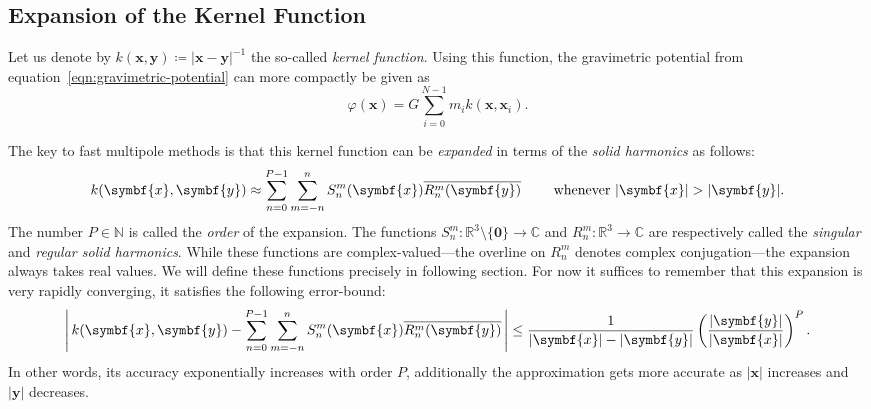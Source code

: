 \documentclass{scrbook}
\newcommand{\naturals}{\ensuremath{\mathbb{N}}}
\newcommand{\reals}{\ensuremath{\mathbb{R}}}
\newcommand{\complex}{\mathbb{C}}
\newcommand{\wholespace}{\ensuremath{\reals^3}}
\newcommand{\vv}[1]{\ensuremath{\symbf{#1}}} %
\begin{document}
\subsection{Expansion of the Kernel Function}
Let us denote by $k(\vv{x},\vv{y})\coloneqq |\vv{x}-\vv{y}|^{-1}$ the so-called
\emph{kernel function}. Using this function, the gravimetric potential from
equation~\eqref{eqn:gravimetric-potential} can more compactly be given as
\begin{equation}\label{eqn:kgravimetric-potential}
\varphi(\vv{x})=G\sum_{i=0}^{N-1}m_i k(\vv{x},\vv{x}_i).
\end{equation}

The key to fast multipole methods is that this kernel function can be
\emph{expanded} in terms of the \emph{solid harmonics} as follows:
\begin{equation}\label{eqn:kernel-expansion}
k(\vv{x},\vv{y}) \approx
\sum_{n=0}^{P-1}\sum_{m=-n\vphantom{0}}^n
S_n^m(\vv{x})\overline{R_n^m(\vv{y})}
\qquad\text{ whenever }|\vv{x}| > |\vv{y}|.
\end{equation}
The number $P\in\naturals$ is called the \emph{order} of the expansion.
The functions $S_n^m:\wholespace \setminus \lbrace\vv{0}\rbrace\to\complex$ and
$R_n^m:\wholespace\to\complex$ are respectively called the \emph{singular} and
\emph{regular solid harmonics}. While these functions are complex-valued---the
overline on $R_n^m$ denotes complex conjugation---the expansion always takes
real values. We will define these functions precisely in following section. For
now it suffices to remember that this expansion is very rapidly converging, it
satisfies the following error-bound:\autocite[Theorem~3.2]{greengard1997}
\begin{equation}
\left|\,
k(\vv{x},\vv{y}) - 
\sum_{n=0}^{P-1}\sum_{m=-n\vphantom{0}}^n
S_n^m(\vv{x})\overline{R_n^m(\vv{y})}
\,\right|
\leq \frac{1}{|\vv{x}|-|\vv{y}|}\left(\frac{|\vv{y}|}{|\vv{x}|}\right)^P.
\end{equation}
In other words, its accuracy exponentially increases with order $P$,
additionally the approximation gets more accurate as $|\vv{x}|$ increases and
$|\vv{y}|$ decreases.
\end{document}
